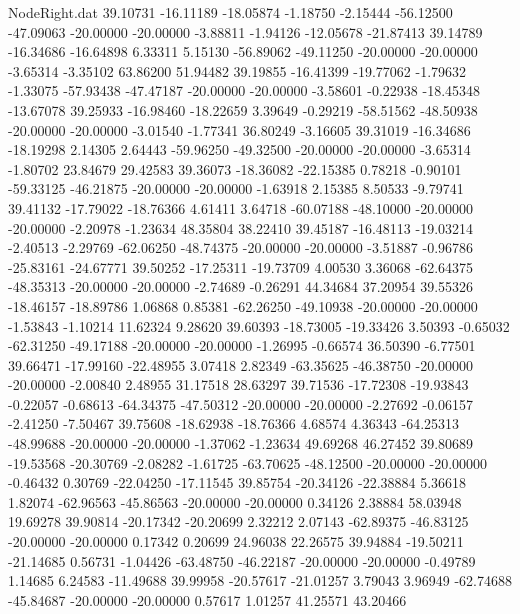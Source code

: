 \begin{filecontents}{NodeRight.dat}
  39.10731  -16.11189  -18.05874    -1.18750   -2.15444  -56.12500  -47.09063  -20.00000  -20.00000   -3.88811   -1.94126  -12.05678  -21.87413
  39.14789  -16.34686  -16.64898     6.33311    5.15130  -56.89062  -49.11250  -20.00000  -20.00000   -3.65314   -3.35102   63.86200   51.94482
  39.19855  -16.41399  -19.77062    -1.79632   -1.33075  -57.93438  -47.47187  -20.00000  -20.00000   -3.58601   -0.22938  -18.45348  -13.67078
  39.25933  -16.98460  -18.22659     3.39649   -0.29219  -58.51562  -48.50938  -20.00000  -20.00000   -3.01540   -1.77341   36.80249   -3.16605
  39.31019  -16.34686  -18.19298     2.14305    2.64443  -59.96250  -49.32500  -20.00000  -20.00000   -3.65314   -1.80702   23.84679   29.42583
  39.36073  -18.36082  -22.15385     0.78218   -0.90101  -59.33125  -46.21875  -20.00000  -20.00000   -1.63918    2.15385    8.50533   -9.79741
  39.41132  -17.79022  -18.76366     4.61411    3.64718  -60.07188  -48.10000  -20.00000  -20.00000   -2.20978   -1.23634   48.35804   38.22410
  39.45187  -16.48113  -19.03214    -2.40513   -2.29769  -62.06250  -48.74375  -20.00000  -20.00000   -3.51887   -0.96786  -25.83161  -24.67771
  39.50252  -17.25311  -19.73709     4.00530    3.36068  -62.64375  -48.35313  -20.00000  -20.00000   -2.74689   -0.26291   44.34684   37.20954
  39.55326  -18.46157  -18.89786     1.06868    0.85381  -62.26250  -49.10938  -20.00000  -20.00000   -1.53843   -1.10214   11.62324    9.28620
  39.60393  -18.73005  -19.33426     3.50393   -0.65032  -62.31250  -49.17188  -20.00000  -20.00000   -1.26995   -0.66574   36.50390   -6.77501
  39.66471  -17.99160  -22.48955     3.07418    2.82349  -63.35625  -46.38750  -20.00000  -20.00000   -2.00840    2.48955   31.17518   28.63297
  39.71536  -17.72308  -19.93843    -0.22057   -0.68613  -64.34375  -47.50312  -20.00000  -20.00000   -2.27692   -0.06157   -2.41250   -7.50467
  39.75608  -18.62938  -18.76366     4.68574    4.36343  -64.25313  -48.99688  -20.00000  -20.00000   -1.37062   -1.23634   49.69268   46.27452
  39.80689  -19.53568  -20.30769    -2.08282   -1.61725  -63.70625  -48.12500  -20.00000  -20.00000   -0.46432    0.30769  -22.04250  -17.11545
  39.85754  -20.34126  -22.38884     5.36618    1.82074  -62.96563  -45.86563  -20.00000  -20.00000    0.34126    2.38884   58.03948   19.69278
  39.90814  -20.17342  -20.20699     2.32212    2.07143  -62.89375  -46.83125  -20.00000  -20.00000    0.17342    0.20699   24.96038   22.26575
  39.94884  -19.50211  -21.14685     0.56731   -1.04426  -63.48750  -46.22187  -20.00000  -20.00000   -0.49789    1.14685    6.24583  -11.49688
  39.99958  -20.57617  -21.01257     3.79043    3.96949  -62.74688  -45.84687  -20.00000  -20.00000    0.57617    1.01257   41.25571   43.20466

\end{filecontents}
